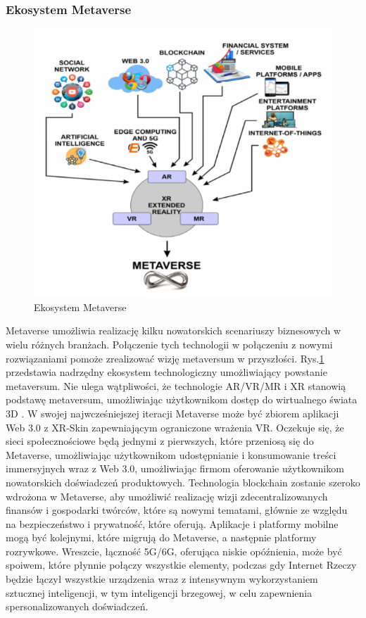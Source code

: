 \subsubsection{Ekosystem Metaverse}

\begin{figure}[!htbp]
    \centering
    \includegraphics[width=\textwidth]{images/metaverse/metaverseEcosystem.png}
    \caption{Ekosystem Metaverse\cite{metaverseSecurityIssuesChallengesAndViableZTAModel}}
    \label{metaverseEcosystemImage}
\end{figure}

Metaverse umożliwia realizację kilku nowatorskich scenariuszy biznesowych w wielu różnych branżach. Połączenie tych technologii w połączeniu z nowymi rozwiązaniami pomoże zrealizować wizję metaversum w przyszłości. Rys.\ref{metaverseEcosystemImage} przedstawia nadrzędny ekosystem technologiczny umożliwiający powstanie metaversum. Nie ulega wątpliwości, że technologie AR/VR/MR i XR stanowią podstawę metaversum, umożliwiając użytkownikom dostęp do wirtualnego świata 3D . W swojej najwcześniejszej iteracji Metaverse może być zbiorem aplikacji Web 3.0 z XR-Skin zapewniającym ograniczone wrażenia VR. Oczekuje się, że sieci społecznościowe będą jednymi z pierwszych, które przeniosą się do Metaverse, umożliwiając użytkownikom udostępnianie i konsumowanie treści immersyjnych wraz z Web 3.0, umożliwiając firmom oferowanie użytkownikom nowatorskich doświadczeń produktowych. Technologia blockchain zostanie szeroko wdrożona w Metaverse, aby umożliwić realizację wizji zdecentralizowanych finansów i gospodarki twórców, które są nowymi tematami, głównie ze względu na bezpieczeństwo i prywatność, które oferują. Aplikacje i platformy mobilne mogą być kolejnymi, które migrują do Metaverse, a następnie platformy rozrywkowe. Wreszcie, łączność 5G/6G, oferująca niskie opóźnienia, może być spoiwem, które płynnie połączy wszystkie elementy, podczas gdy Internet Rzeczy będzie łączył wszystkie urządzenia wraz z intensywnym wykorzystaniem sztucznej inteligencji, w tym inteligencji brzegowej, w celu zapewnienia spersonalizowanych doświadczeń\cite{metaverseSecurityIssuesChallengesAndViableZTAModel}.


